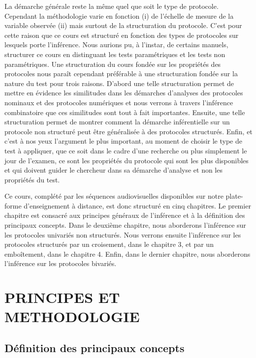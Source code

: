 \documentclass[]{book}
\theoremstyle{definition}
\theoremstyle{definition}
\theoremstyle{definition}
\theoremstyle{remark}
\begin{document}
La démarche générale reste la même quel que soit le type de protocole.
Cependant la méthodologie varie en fonction (i) de l'échelle de mesure
de la variable observée (ii) mais surtout de la structuration du
protocole. C'est pour cette raison que ce cours est structuré en
fonction des types de protocoles sur lesquels porte l'inférence. Nous
aurions pu, à l'instar, de certains manuels, structurer ce cours en
distinguant les tests paramétriques et les tests non paramétriques. Une
structuration du cours fondée sur les propriétés des protocoles nous
paraît cependant préférable à une structuration fondée sur la nature du
test pour trois raisons. D'abord une telle structuration permet de
mettre en évidence les similitudes dans les démarches d'analyses des
protocoles nominaux et des protocoles numériques et nous verrons à
travers l'inférence combinatoire que ces similitudes sont tout à fait
importantes. Ensuite, une telle structuration permet de montrer comment
la démarche inférentielle sur un protocole non structuré peut être
généralisée à des protocoles structurés. Enfin, et c'est à nos yeux
l'argument le plus important, au moment de choisir le type de test à
appliquer, que ce soit dans le cadre d'une recherche ou plus simplement
le jour de l'examen, ce sont les propriétés du protocole qui sont les
plus disponibles et qui doivent guider le chercheur dans sa démarche
d'analyse et non les propriétés du test.

Ce cours, complété par les séquences audiovisuelles disponibles sur
notre plate-forme d'enseignement à distance, est donc structuré en cinq
chapitres. Le premier chapitre est consacré aux principes généraux de
l'inférence et à la définition des principaux concepts. Dans le deuxième
chapitre, nous aborderons l'inférence sur les protocoles univariés non
structurés. Nous verrons ensuite l'inférence sur les protocoles
structurés par un croisement, dans le chapitre 3, et par un emboîtement,
dans le chapitre 4. Enfin, dans le dernier chapitre, nous aborderons
l'inférence sur les protocoles bivariés.

\hypertarget{principes-et-methodologie}{%
\chapter{PRINCIPES ET METHODOLOGIE}\label{principes-et-methodologie}}

\hypertarget{definition-des-principaux-concepts}{%
\section{Définition des principaux
concepts}\label{definition-des-principaux-concepts}}
\end{document}
